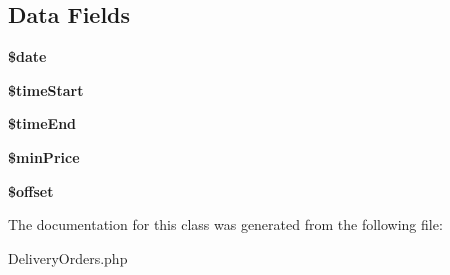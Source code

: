 \subsection*{Data Fields}
\begin{DoxyCompactItemize}
\item 
\hypertarget{classapp_1_1models_1_1_delivery_orders_a481c918f8d853749e00b5942cabf599a}{}\label{classapp_1_1models_1_1_delivery_orders_a481c918f8d853749e00b5942cabf599a} 
{\bfseries \$date}
\item 
\hypertarget{classapp_1_1models_1_1_delivery_orders_a9ece7043091b6a51af5679649e67b7cd}{}\label{classapp_1_1models_1_1_delivery_orders_a9ece7043091b6a51af5679649e67b7cd} 
{\bfseries \$time\+Start}
\item 
\hypertarget{classapp_1_1models_1_1_delivery_orders_a881c9cd0de6e69171af6cdfeb108da0c}{}\label{classapp_1_1models_1_1_delivery_orders_a881c9cd0de6e69171af6cdfeb108da0c} 
{\bfseries \$time\+End}
\item 
\hypertarget{classapp_1_1models_1_1_delivery_orders_a3a29daa6c3b624c09ed790e3228ed67e}{}\label{classapp_1_1models_1_1_delivery_orders_a3a29daa6c3b624c09ed790e3228ed67e} 
{\bfseries \$min\+Price}
\item 
\hypertarget{classapp_1_1models_1_1_delivery_orders_aec4de82415d7f05cb9748d12d3a95a87}{}\label{classapp_1_1models_1_1_delivery_orders_aec4de82415d7f05cb9748d12d3a95a87} 
{\bfseries \$offset}
\end{DoxyCompactItemize}


The documentation for this class was generated from the following file\+:\begin{DoxyCompactItemize}
\item 
Delivery\+Orders.\+php\end{DoxyCompactItemize}
